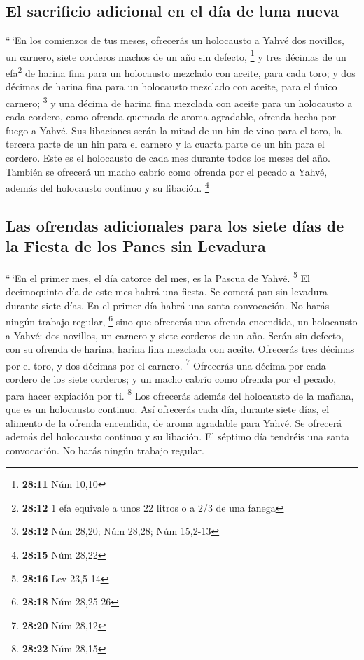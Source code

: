 \begin{paracol}{2}
\hypertarget{el-sacrificio-adicional-en-el-duxeda-de-luna-nueva}{%
\subsection{El sacrificio adicional en el día de luna
nueva}\label{el-sacrificio-adicional-en-el-duxeda-de-luna-nueva}}

 ``\,`En los comienzos de tus meses, ofrecerás un
holocausto a Yahvé dos novillos, un carnero, siete corderos machos de un
año sin defecto, \footnote{\textbf{28:11} Núm 10,10}  y
tres décimas de un efa\footnote{\textbf{28:12} 1 efa equivale a unos 22
  litros o a 2/3 de una fanega} de harina fina para un holocausto
mezclado con aceite, para cada toro; y dos décimas de harina fina para
un holocausto mezclado con aceite, para el único carnero; \footnote{\textbf{28:12}
  Núm 28,20; Núm 28,28; Núm 15,2-13}  y una décima de
harina fina mezclada con aceite para un holocausto a cada cordero, como
ofrenda quemada de aroma agradable, ofrenda hecha por fuego a Yahvé.
 Sus libaciones serán la mitad de un hin de vino para el
toro, la tercera parte de un hin para el carnero y la cuarta parte de un
hin para el cordero. Este es el holocausto de cada mes durante todos los
meses del año.  También se ofrecerá un macho cabrío como
ofrenda por el pecado a Yahvé, además del holocausto continuo y su
libación. \footnote{\textbf{28:15} Núm 28,22}

\hypertarget{las-ofrendas-adicionales-para-los-siete-duxedas-de-la-fiesta-de-los-panes-sin-levadura}{%
\subsection{Las ofrendas adicionales para los siete días de la Fiesta de
los Panes sin
Levadura}\label{las-ofrendas-adicionales-para-los-siete-duxedas-de-la-fiesta-de-los-panes-sin-levadura}}

 ``\,`En el primer mes, el día catorce del mes, es la
Pascua de Yahvé. \footnote{\textbf{28:16} Lev 23,5-14} 
El decimoquinto día de este mes habrá una fiesta. Se comerá pan sin
levadura durante siete días.  En el primer día habrá una
santa convocación. No harás ningún trabajo regular, \footnote{\textbf{28:18}
  Núm 28,25-26}  sino que ofrecerás una ofrenda
encendida, un holocausto a Yahvé: dos novillos, un carnero y siete
corderos de un año. Serán sin defecto,  con su ofrenda de
harina, harina fina mezclada con aceite. Ofrecerás tres décimas por el
toro, y dos décimas por el carnero. \footnote{\textbf{28:20} Núm 28,12}
 Ofrecerás una décima por cada cordero de los siete
corderos;  y un macho cabrío como ofrenda por el pecado,
para hacer expiación por ti. \footnote{\textbf{28:22} Núm 28,15}
 Los ofrecerás además del holocausto de la mañana, que es
un holocausto continuo.  Así ofrecerás cada día, durante
siete días, el alimento de la ofrenda encendida, de aroma agradable para
Yahvé. Se ofrecerá además del holocausto continuo y su libación.
 El séptimo día tendréis una santa convocación. No harás
ningún trabajo regular.


\end{paracol}

